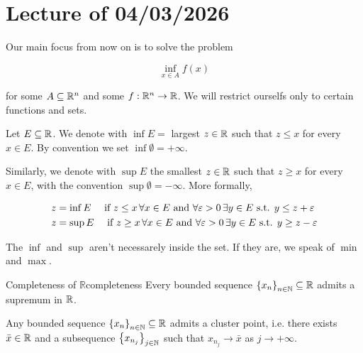 \chapter{Lecture \thechapter{} of 04/03/2026}

Our main focus from now on is to solve the problem 

\[ \inf_{x \in A} f(x) \]

for some $A \subseteq {\mathbb{R}^n}$ and some $f : {\mathbb{R}^n} \to \mathbb{R}$. We will restrict ourselfs only to certain functions and sets.

\begin{definition}
    
    Let $E \subseteq \mathbb{R}$. We denote with $\inf E =$ largest $z \in \mathbb{R}$ such that $z \le x$ for every $x \in E$. By convention we set $\inf \emptyset = +\infty$. 

    Similarly, we denote with $\sup E$ the smallest $z \in \mathbb{R}$ such that $z \ge x$ for every $x \in E$, with the convention $\sup \emptyset = -\infty$. More formally, 

    \begin{align*}
        z &= \inf E \quad \text{ if } z \le x \,\forall x \in E \text{ and } \forall \varepsilon > 0\, \exists y \in E \text{ s.t. } y \le z + \varepsilon \\
        z &= \sup E \quad \text{ if } z \ge x \,\forall x \in E \text{ and } \forall \varepsilon > 0\, \exists y \in E \text{ s.t. } y \ge z - \varepsilon 
    \end{align*}

\end{definition}

\begin{remark}
    
    The $\inf$ and $\sup$ aren't necessarely inside the set. If they are, we speak of $\min$ and $\max$.

\end{remark}

\begin{axiom}{Completeness of $\mathbb{R}$}{completeness}
    Every bounded sequence $\left\{ x_n \right\}_{n \in \mathbb{N}} \subseteq \mathbb{R}$ admits a supremum  in $\mathbb{R}$.
\end{axiom}

\begin{theorem}

    Any bounded sequence $\left\{ x_n \right\}_{n \in \mathbb{N}} \subseteq \mathbb{R}$ admits a cluster point, i.e. there exists $\bar{x} \in \mathbb{R}$ and a subsequence $\left\{ x_{n_j} \right\}_{j \in \mathbb{N}}$ such that $x_{n_j} \to \bar{x}$ as $j \to +\infty$.
    
\end{theorem}

